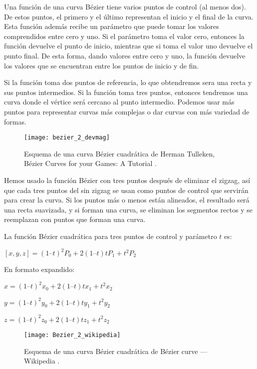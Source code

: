 Una función de una curva Bézier tiene varios puntos de control (al menos dos). De estos puntos, el primero y el último representan el inicio y el final de la curva. Esta función además recibe un parámetro que puede tomar los valores comprendidos entre cero y uno. Si el parámetro toma el valor cero, entonces la función devuelve el punto de inicio, mientras que si toma el valor uno devuelve el punto final. De esta forma, dando valores entre cero y uno, la función devuelve los valores que se encuentran entre los puntos de inicio y de fin.

Si la función toma dos puntos de referencia, lo que obtendremos sera una recta y sus puntos intermedios. Si la función toma tres puntos, entonces tendremos una curva donde el vértice será cercano al punto intermedio. Podemos usar más puntos para representar curvas más complejas o dar curvas con más variedad de formas.

\begin{figure}[htpb]
    \centering
    \texttt{[image: bezier\_2\_devmag]}
    \caption[Esquema de una curva Bézier cuadrática de Herman Tulleken]{Esquema de una curva Bézier cuadrática de Herman Tulleken, Bézier Curves for your Games: A Tutorial \cite{bezierdevmag_imagen}.}
    \label{fig:basics AFM sketch}
\end{figure}

Hemos usado la función Bézier con tres puntos después de eliminar el zigzag, así que cada tres puntos del \Astar sin zigzag se usan como puntos de control que servirán para crear la curva. Si los puntos más o menos están alineados, el resultado será una recta suavizada, y si forman una curva, se eliminan los segmentos rectos y se reemplazan con puntos que forman una curva. 

La función Bézier cuadrática para tres puntos de control y parámetro $t$ es:

\begin{center}
$[x, y, z] = (1 – t)^2P_0 + 2(1 – t)tP_1 + t^2P_2$
\end{center}

En formato expandido:
\begin{center}
$x = (1 – t)^2x_0 + 2(1 – t)tx_1 + t^2x_2$

$y = (1 – t)^2y_0 + 2(1 – t)ty_1 + t^2y_2$

$z = (1 – t)^2z_0 + 2(1 – t)tz_1 + t^2z_2$
\end{center}

\begin{figure}[htpb]
    \centering
    \texttt{[image: Bezier\_2\_wikipedia]}
    \caption[Esquema de una curva Bézier cuadrática, Wikipedia]{Esquema de una curva Bézier cuadrática de Bézier curve --- Wikipedia \cite{wiki:bezierimagen}.}
    \label{fig:basics AFM sketch}
\end{figure}

